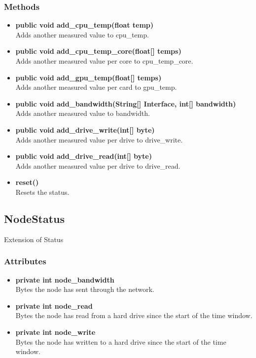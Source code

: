 \subsubsection{Methods}
\begin{itemize}
	\item \textbf{public void add\_cpu\_temp(float temp)}\\
	Adds another measured value to cpu\_temp.
	\item \textbf{public void add\_cpu\_temp\_core(float[] temps)}\\
	Adds another measured value per core to cpu\_temp\_core.
	\item \textbf{public void add\_gpu\_temp(float[] temps)}\\
	Adds another measured value per card to gpu\_temp.
	\item \textbf{public void add\_bandwidth(String[] Interface, int[] bandwidth)}\\
	Adds another measured value to bandwidth.
	\item \textbf{public void add\_drive\_write(int[] byte)}\\
	Adds another measured value per drive to drive\_write.
	\item \textbf{public void add\_drive\_read(int[] byte)}\\
	Adds another measured value per drive to drive\_read.
	\item \textbf{reset()}\\
	Resets the status.
\end{itemize}

\subsection{NodeStatus}
Extension of Status

\subsubsection{Attributes}
\begin{itemize}
	\item \textbf{private int node\_bandwidth}\\
	Bytes the node has sent through the network.
	\item \textbf{private int node\_read}\\
	Bytes the node has read from a hard drive since the start of the time window.
	\item \textbf{private int node\_write}\\
	Bytes the node has written to a hard drive since the start of the time window.
\end{itemize}

